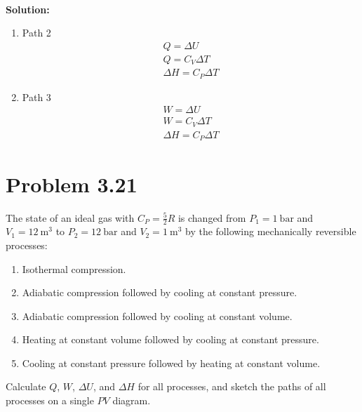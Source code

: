 \documentclass{article}
\newcommand*\widefbox[1]{\fbox{\vspace{0.5em}\hspace{2em}#1\hspace{2em}\vspace{0.5em}}}
\newenvironment{solution}{\par\noindent\textbf{\\Solution:\\}}{\par\medskip}
\begin{document}
\begin{solution}
\begin{enumerate}[label=(\alph*)]
\begin{enumerate}[label=\roman*.]
        \item Path 2
          \begin{gather*}
            Q=\Delta U\\
            Q=C_{V}\Delta T\\
            \Delta H=C_{P}\Delta T
          \end{gather*}
        \item Path 3
          \begin{gather*}
            W=\Delta U\\
            W=C_{V}\Delta T\\
            \Delta H=C_{P}\Delta T
          \end{gather*}
      \end{enumerate}
  \end{enumerate}
\end{solution}

\section*{Problem 3.21}
The state of an ideal gas with $C_P = \frac{5}{2}R$ is changed from
$P_1 = \SI{1}{\bar}$ and $V_1 = \SI{12}{\meter\cubed}$ to $P_2 =
\SI{12}{\bar}$ and $V_2 = \SI{1}{\meter\cubed}$ by the following
mechanically reversible processes:
\begin{enumerate}[label=(\alph*)]
  \item Isothermal compression.
  \item Adiabatic compression followed by cooling at constant pressure.
  \item Adiabatic compression followed by cooling at constant volume.
  \item Heating at constant volume followed by cooling at constant pressure.
  \item Cooling at constant pressure followed by heating at constant volume.
\end{enumerate}
Calculate $Q$, $W$, $\Delta U$, and $\Delta H$ for all processes, and
sketch the paths of all processes on a single $PV$ diagram.
\end{document}
